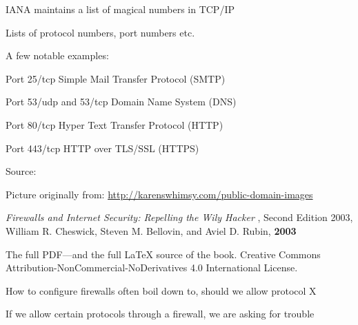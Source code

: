\documentclass[Screen16to9,17pt]{foils}
\begin{document}


\begin{list1}
\item IANA maintains a list of magical numbers in TCP/IP
\item Lists of protocol numbers, port numbers etc.
\item A few notable examples:
\begin{list2}
\item Port 25/tcp Simple Mail Transfer Protocol (SMTP)
\item Port 53/udp and 53/tcp Domain Name System (DNS)
\item Port 80/tcp Hyper Text Transfer Protocol (HTTP)
\item Port 443/tcp HTTP over TLS/SSL (HTTPS)
\end{list2}
\item Source: 
\end{list1}




\centerline{Picture originally from: \url{http://karenswhimsy.com/public-domain-images}}




\begin{list2}
\item \emph{Firewalls and Internet Security: Repelling the Wily Hacker} , Second Edition 2003, William R. Cheswick, Steven M. Bellovin, and Aviel D. Rubin, {\bf 2003} 
\item The full PDF—and the full LaTeX source of the book.
Creative Commons Attribution-NonCommercial-NoDerivatives 4.0 International License.
\item How to configure firewalls often boil down to, should we allow protocol X
\item If we allow certain protocols through a firewall, we are asking for trouble
\end{list2}


\end{document}
